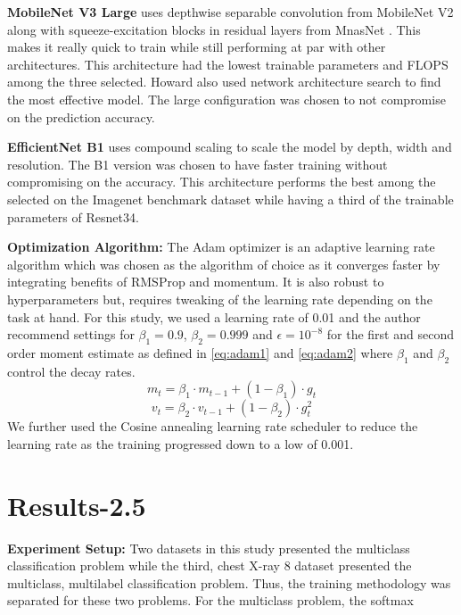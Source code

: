 \documentclass[10pt,twocolumn,letterpaper]{article}
\begin{document}
\textbf{MobileNet V3 Large} uses depthwise separable convolution from MobileNet V2 
\cite{sandler2018mobilenetv2} along with squeeze-excitation blocks in residual layers 
from MnasNet \cite{tan2019mnasnet}. This makes it really quick to train while still performing 
at par with other architectures. This architecture had the lowest trainable parameters and FLOPS 
among the three selected. Howard \etal \cite{howard2019searching} also used 
network architecture search to find the most effective model. The large configuration 
was chosen to not compromise on the prediction accuracy.

\textbf{EfficientNet B1} uses compound scaling to scale the model by depth, width and 
resolution. The B1 version was chosen to have faster training without compromising on the 
accuracy. \cite{tan2019efficientnet} This architecture performs the best among the selected 
on the Imagenet benchmark dataset while having a third of the trainable parameters of Resnet34.

\textbf{Optimization Algorithm:}
The Adam optimizer \cite{kingma2014adam} is an adaptive learning rate algorithm which 
was chosen as the algorithm of choice as it converges faster by integrating benefits of  
RMSProp and momentum. It is also robust to hyperparameters but, 
requires tweaking of the learning rate depending on the task at hand. For this study, 
we used a learning rate of 0.01 and the author recommend settings for $\beta_{1} =
0.9$, $\beta_{2} = 0.999$ and $\epsilon = 10^{-8}$ for the first and second order moment estimate 
as defined in \cref{eq:adam1} and \cref{eq:adam2} where $\beta_{1}$ and $\beta_{2}$ control the decay rates.
\begin{equation}
m_{t} = \beta_{1} \cdot m_{t-1} + (1 - \beta_{1}) \cdot g_{t}
\label{eq:adam1}
\end{equation}
\begin{equation}
  v_{t} = \beta_{2} \cdot v_{t-1} + (1 - \beta_{2}) \cdot g_{t}^{2}
  \label{eq:adam2}
  \end{equation}
We further used the Cosine annealing \cite{loshchilov2016sgdr} learning rate scheduler 
to reduce the learning rate as the training progressed down to a low of 0.001. 

\section{Results-2.5} 
\label{sec:method}
\textbf{Experiment Setup:}
Two datasets in this study presented the multiclass classification problem while the third, 
chest X-ray 8 dataset presented the multiclass, multilabel classification problem. Thus, the 
training methodology was separated for these two problems. For the multiclass problem, the softmax
\end{document}
